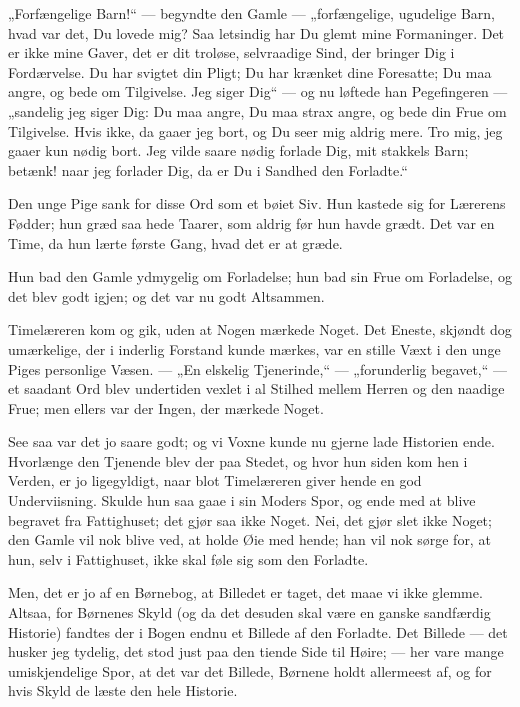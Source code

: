 \documentclass[12pt,a4paper]{book}
\newcommand{\apage}[1]{\marginnote{\footnotesize\textit{[#1]}}}
\begin{document}
„Forfængelige Barn!“ --- begyndte den Gamle --- „forfængelige,
ugudelige Barn, hvad var det, Du lovede mig? Saa letsindig har Du
glemt mine Formaninger. Det er ikke mine Gaver, det er dit troløse,
selvraadige Sind, der bringer Dig i Fordærvelse. Du har svigtet din
Pligt; Du har krænket dine Foresatte; Du maa angre, og bede om
Tilgivelse. Jeg siger Dig“ --- og nu løftede han Pegefingeren ---
„sandelig jeg siger Dig: Du maa angre, Du maa strax angre, og bede
din Frue om Tilgivelse. Hvis ikke, da gaaer jeg bort, og Du seer
mig aldrig mere. Tro mig, jeg gaaer kun nødig bort. Jeg vilde saare
nødig forlade Dig, mit stakkels Barn; betænk! naar jeg forlader
Dig, da er Du i Sandhed den Forladte.“

Den unge Pige sank for disse Ord som et bøiet Siv. Hun kastede sig
for Lærerens Fødder; hun græd saa hede Taarer, som aldrig før hun
havde grædt. Det var en Time, da hun lærte første Gang, hvad det er
at græde.

Hun bad den Gamle ydmygelig om Forladelse; hun bad sin Frue om
Forladelse, og det blev godt igjen; og det var nu godt Altsammen.

Timelæreren kom og gik, uden at Nogen mærkede Noget. Det Eneste,
skjøndt dog umærkelige, der i inderlig Forstand kunde mærkes, var
en stille Væxt i den unge Piges personlige Væsen. --- „En elskelig
Tjenerinde,“ --- „forunderlig begavet,“ --- et saadant Ord blev
undertiden vexlet i al Stilhed mellem Herren og den naadige Frue;
men ellers var der Ingen, der mærkede Noget.

See saa var det jo saare godt; og vi Voxne kunde nu gjerne lade
Historien ende. Hvorlænge den Tjenende blev der paa Stedet, og
hvor hun siden kom hen i Verden, er jo ligegyldigt, naar blot
Timelæreren giver hende en god Underviisning. Skulde hun saa gaae
i sin Moders Spor, og ende
med at blive begravet fra Fattighuset; det gjør saa ikke \apage{91} Noget.
Nei, det gjør slet ikke Noget; den Gamle vil nok blive ved, at
holde Øie med hende; han vil nok sørge for, at hun, selv i
Fattighuset, ikke skal føle sig som den Forladte.

Men, det er jo af en Børnebog, at Billedet er taget, det maae vi
ikke glemme. Altsaa, for Børnenes Skyld (og da det desuden skal
være en ganske sandfærdig Historie) fandtes der i Bogen endnu et
Billede af den Forladte. Det Billede --- det husker jeg tydelig,
det stod just paa den tiende Side til Høire; --- her vare mange
umiskjendelige Spor, at det var det Billede, Børnene holdt
allermeest af, og for hvis Skyld de læste den hele Historie.
\end{document}
